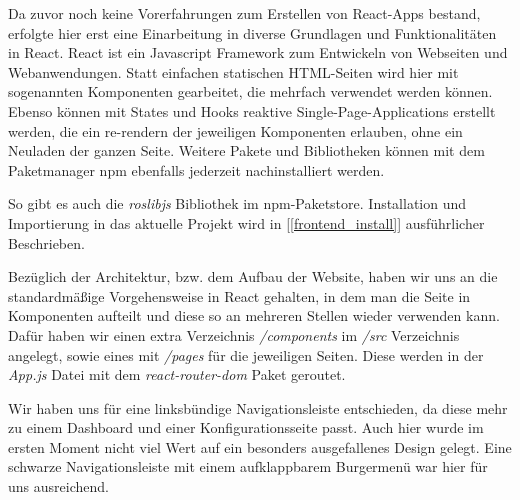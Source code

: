 \begin{flushleft}

Da zuvor noch keine Vorerfahrungen zum Erstellen von React-Apps bestand, erfolgte hier erst eine Einarbeitung in diverse Grundlagen und Funktionalitäten in  React.
React ist ein Javascript Framework zum Entwickeln von Webseiten und Webanwendungen.
Statt einfachen statischen HTML-Seiten wird hier mit sogenannten Komponenten gearbeitet, die mehrfach verwendet werden können.
Ebenso können mit States und Hooks reaktive Single-Page-Applications erstellt werden, die ein re-rendern der jeweiligen Komponenten erlauben, ohne ein Neuladen der ganzen Seite.
Weitere Pakete und Bibliotheken können mit dem Paketmanager npm ebenfalls jederzeit nachinstalliert werden.

So gibt es auch die \textit{roslibjs} Bibliothek im npm-Paketstore.
Installation und Importierung in das aktuelle Projekt wird in [\ref{frontend_install}] ausführlicher Beschrieben.



Bezüglich der Architektur, bzw. dem Aufbau der Website, haben wir uns an die standardmäßige Vorgehensweise in React gehalten, in dem man die Seite in Komponenten aufteilt und diese so an mehreren Stellen wieder verwenden kann. Dafür haben wir einen extra Verzeichnis \textit{/components} im \textit{/src} Verzeichnis angelegt, sowie eines mit \textit{/pages} für die jeweiligen Seiten. Diese werden in der \textit{App.js} Datei mit dem \textit{react-router-dom} Paket geroutet.


Wir haben uns für eine linksbündige Navigationsleiste entschieden, da diese mehr zu einem Dashboard und einer Konfigurationsseite passt. Auch hier wurde im ersten Moment nicht viel Wert auf ein besonders ausgefallenes Design gelegt. Eine schwarze Navigationsleiste mit einem aufklappbarem Burgermenü war hier für uns ausreichend. 


\end{flushleft}
